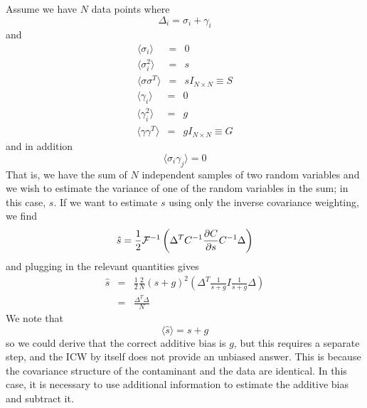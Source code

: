 \documentclass[preprint2,numberedappendix,tighten]{aastex6}
\newcommand{\invC}{\ensuremath{C^{-1}}}
\newcommand{\half}{\ensuremath{\frac{1}{2}}}
\newcommand{\PDeriv}[2]{\ensuremath{\frac{\partial #1}{\partial #2}}}
\begin{document}
Assume we have $N$ data points where
\begin{equation}
\Delta_i = \sigma_i + \gamma_i
\end{equation}
and
\begin{eqnarray}
\langle \sigma_i \rangle & = & 0 \\
\langle \sigma^2_i \rangle & = & s \\
 \langle \sigma \sigma^T \rangle & = & s I_{N \times N} \equiv S
\end{eqnarray}
\begin{eqnarray}
\langle \gamma_i \rangle & = & 0 \\
\langle \gamma^2_i \rangle & = & g \\
 \langle \gamma \gamma^T \rangle & = & g I_{N \times N} \equiv G
\end{eqnarray}
and in addition
\begin{equation}
\langle \sigma_i \gamma_j \rangle = 0
\end{equation}
That is, we have the sum of $N$ independent samples of two random variables and we wish to estimate the variance of one of the random variables in the sum; in this case, $s$.
If we want to estimate $s$ using only the inverse covariance weighting, we find
\begin{equation}
\label{eq:CaseOneICW}
\hat{s} = \half {\cal F}^{-1} \left( \Delta^T \invC \PDeriv{C}{s}  \invC \Delta \right)
\end{equation}
and plugging in the relevant quantities gives
\begin{eqnarray}
\hat{s} & = & \half \frac{2}{N} (s+g)^2 \left( \Delta^T \frac{1}{s+g} I \frac{1}{s+g} \Delta \right) \\
& = & \frac{\Delta^T \Delta}{N}
\end{eqnarray}
We note that
\begin{equation}
\langle \hat{s} \rangle = s + g
\end{equation}
so we could derive that the correct additive bias is $g$, but this requires a separate step, and the ICW by itself does not provide an unbiased answer.  This is because the covariance structure of the contaminant and the data are identical.  In this case, it is necessary to use additional information to estimate the additive bias and subtract it.
\end{document}
